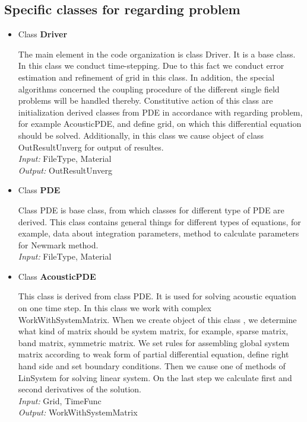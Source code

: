 \subsection{ Specific classes for regarding problem }
\begin{itemize}
\item { Class {\bf Driver}} \\
\begin{print}
The main element in the code organization is class Driver. It is a base class. In this class we conduct time-stepping. Due to this fact we conduct error estimation and refinement of grid in this class. In addition, the special algorithms concerned the coupling procedure of the different single field problems will be handled thereby. Constitutive action of this class are initialization derived classes from PDE in accordance with regarding problem, for example AcousticPDE, and define grid, on which this differential equation should be solved. Additionally, in this class we 
cause object of class {\sf OutResultUnverg}  for output of resultes.\\
{\em Input: } FileType, Material \\
{\em Output: } OutResultUnverg 
\end{print}
%
\item{ Class {\bf PDE}} \\
\begin{print}
Class PDE is base class, from which classes for different type of PDE are derived.
This class contains general things for different types of equations, for example, data about integration parameters, method to calculate parameters for Newmark method. \\
{\em Input: } FileType, Material \\
\end{print}
%
\item{ Class {\bf AcousticPDE} } \\
\begin{print}
This class is derived from class PDE. It is used for solving acoustic equation on one time step. 
In this class we work with complex WorkWithSystemMatrix. When we create object of this class , we determine what kind of matrix should be system matrix, for example, sparse matrix, band matrix, symmetric matrix. We set rules for assembling global system matrix according to weak form of partial differential equation, define right hand side and set boundary conditions. Then we cause one of methods of LinSystem for solving linear system. On the last step we calculate first and second derivatives of the solution. \\ 
{\em Input: } Grid, TimeFunc \\
{\em Output: } WorkWithSystemMatrix 
\end{print}
%
\end{itemize}
%
